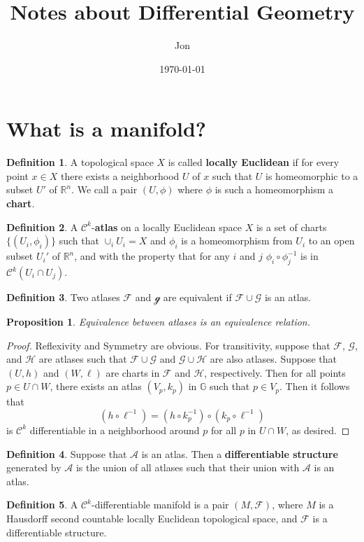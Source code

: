\documentclass[12pt]{article}
\title{Notes about Differential Geometry}
\author{Jon}
\date{\today}
\theoremstyle{definition}
\newtheorem{definition}{Definition}
\theoremstyle{plain}
\newtheorem{proposition}{Proposition}
\newcommand{\s}[1]{\mathcal{#1}}
\begin{document}
\maketitle
\section{What is a manifold?}
\begin{definition}
A topological space $X$ is called \textbf{locally Euclidean} if for every point $x \in X$ there exists a neighborhood $U$ of $x$ such that $U$ is homeomorphic to a subset $U'$ of $\mathbb{R}^n$. We call a pair $(U, \phi)$ where $\phi$ is such a homeomorphism a \textbf{chart}.
\end{definition}

\begin{definition}
A $\mathcal{C}^k$-\textbf{atlas} on a locally Euclidean space $X$ is a set of charts $\{(U_i, \phi_i)\}$ such that $\cup_iU_i = X$ and $\phi_i$ is a homeomorphism from $U_i$ to an open subset $U_i'$ of $\mathbb{R}^n$, and with the property that for any $i$ and $j$ $\phi_i \circ \phi_j^{-1}$ is in $\mathcal{C}^k(U_i \cap U_j)$. 
\end{definition}

\begin{definition}
Two atlases $\mathcal{F}$ and $\mathcal{g}$ are equivalent if $\s{F} \cup \s{G}$ is an atlas.
\end{definition}

\begin{proposition}
Equivalence between atlases is an equivalence relation.
\end{proposition}

\begin{proof}
Reflexivity and Symmetry are obvious. For transitivity, suppose that $\mathcal{F}$, $\mathcal{G}$, and $\mathcal{H}$ are atlases such that $\s{F} \cup \s{G}$ and $\s{G} \cup \s{H}$ are also atlases. Suppose that $(U, h)$ and $(W, \ell)$ are charts in $\s{F}$ and $\s{H}$, respectively. Then for all points $p \in U \cap W$, there exists an atlas $(V_p, k_p)$ in $\mathbb{G}$ such that $p \in V_p$. Then it follows that 
\[(h \circ \ell^{-1}) = (h \circ k_p^{-1}) \circ (k_p \circ \ell^{-1})\] is $\s{C}^k$ differentiable in a neighborhood around $p$ for all $p$ in $U \cap W$, as desired.
\end{proof}

\begin{definition}
Suppose that $\s{A}$ is an atlas. Then a \textbf{differentiable structure} generated by $\s{A}$ is the union of all atlases such that their union with $\s{A}$ is an atlas.
\end{definition}

\begin{definition}
A $\s{C}^k$-differentiable manifold is a pair $(M, \s{F})$, where $M$ is a Hausdorff second countable locally Euclidean topological space, and $\s{F}$ is a differentiable structure.
\end{definition}
\end{document}
